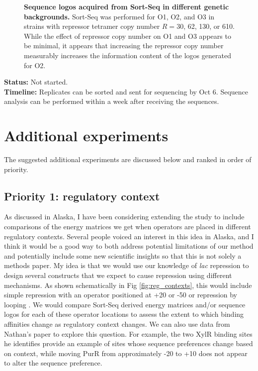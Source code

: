 \documentclass[10pt,letterpaper]{article}
\begin{document}
\begin{figure}[ht!]
\begin{center}
\caption{\textbf{Sequence logos acquired from Sort-Seq in different genetic backgrounds.} Sort-Seq was performed for O1, O2, and O3 in strains with repressor tetramer copy number $R = 30$, 62, 130, or 610. While the effect of repressor copy number on O1 and O3 appears to be minimal, it appears that increasing the repressor copy number measurably increases the information content of the logos generated for O2.  }
\label{fig:seq_logos}
\end{center}
\end{figure}

\noindent \textbf{Status:} Not started.\\

\noindent \textbf{Timeline:} Replicates can be sorted and sent for sequencing by Oct 6.
Sequence analysis can be performed within a week after receiving the sequences.

\section*{Additional experiments}

The suggested additional experiments are discussed below and ranked in order of priority.

\subsection*{Priority 1: regulatory context}

As discussed in Alaska, I have been considering extending the study to include
comparisons of the energy matrices we get when operators are placed in different
regulatory contexts. Several people voiced an interest in this idea in Alaska,
and I think it would be a good way to both address potential limitations of our
method and potentially include some new scientific insights so that this is not
solely a methods paper. My idea is that we would use our knowledge of
\textit{lac} repression to design several constructs that we expect to cause
repression using different mechanisms. As shown schematically in Fig
\ref{fig:reg_contexts}, this would include simple repression with an operator
positioned at +20 or -50 \cite{Garcia2012} or repression by looping
\cite{Boedicker2013}. We would compare Sort-Seq derived energy matrices and/or
sequence logos for each of these operator locations to assess the extent to
which binding affinities change as regulatory context changes. We can also use
data from Nathan's paper to explore this question. For example, the two XylR
binding sites he identifies provide an example of sites whose sequence
preferences change based on context, while moving PurR from approximately -20
to +10 does not appear to alter the sequence preference.\\
\end{document}
